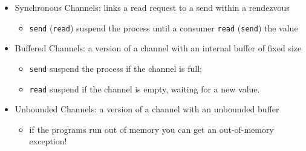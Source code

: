 \documentclass[aspectratio=169,xcolor=dvipsnames]{beamer}
\begin{document}
\begin{frame}  
    \begin{itemize}
        \item Synchronous Channels: links a read request to a send within a rendezvous
        \begin{itemize}
            \item \texttt{send} (\texttt{read}) suspend the process until a consumer \texttt{read} (\texttt{send}) the value
        \end{itemize}
        \item Buffered Channels: a version of a channel with an internal buffer of fixed size
        \begin{itemize}
            \item \texttt{send} suspend the process if the channel is full;
            \item \texttt{read} suspend if the channel is empty, waiting for a new value.
        \end{itemize}
        \item Unbounded Channels: a version of a channel with an unbounded buffer
        \begin{itemize}
            \item if the programs run out of memory you can get an out-of-memory exception!
        \end{itemize}
    \end{itemize}
\end{frame}

\end{document}
